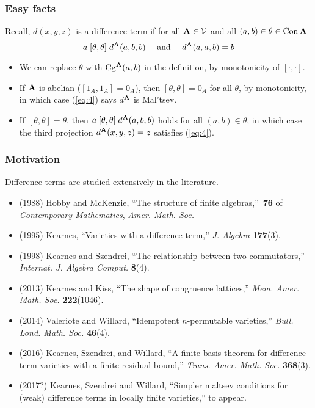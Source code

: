 \documentclass[12pt,xcolor=dvipsnames%
   ]{beamer}
\begin{document}
\begin{frame}
\frametitle{Easy facts}

Recall, $d(x,y,z)$ is a \alert{difference term}
if for all $\mathbf{A} \in \mathcal{V}$ and all $(a,b) \in \theta\in \operatorname{Con}\mathbf{A}$
\begin{equation}
\label{eq:4}  
a \mathrel{[\theta, \theta]} d^{\mathbf{A}}(a,b,b) 
\quad \text{ and } \quad
d^{\mathbf{A}}(a,a,b) = b 
\end{equation}

\begin{itemize}
\item<1->  We can replace $\theta$ 
with $\operatorname{Cg}^{\mathbf{A}}(a,b)$ in the definition, 
by monotonicity of $[\cdot, \cdot]$.
\item<2->
  If $\mathbf{A}$ is \alert{abelian} ($[1_A, 1_A] = 0_A$), then 
  $[\theta, \theta] = 0_A$ for all $\theta$, by
  monotonicity, in which case
  (\ref{eq:4}) says $d^{\mathbf{A}}$ is Mal'tsev.
\item<3-> If $[\theta, \theta] = \theta$, then
  $a \mathrel{[\theta, \theta]} d^{\mathbf{A}}(a,b,b)$ holds
  for all $(a, b) \in \theta$, in which case
the third projection $d^{\mathbf{A}}(x,y,z) = z$ satisfies (\ref{eq:4}).
\end{itemize}


\end{frame}


\begin{frame}
  \frametitle{Motivation}
Difference terms are studied extensively in the literature.

\begin{itemize}
\item
  {\footnotesize (1988)
    Hobby and McKenzie, ``The structure of finite algebras,''~{\bf 76} of
    {\em Contemporary Mathematics}, {\em Amer. Math. Soc.} }
\item
  {\footnotesize (1995) 
    Kearnes, ``Varieties with a difference term,'' 
    {\em J. Algebra} {\bf 177}(3).}
\item
  {\footnotesize (1998)
    Kearnes and Szendrei, ``The relationship between two commutators,''
    {\em Internat. J. Algebra Comput.} {\bf 8}(4). } 
\item
  {\footnotesize (2013)
    Kearnes and Kiss, ``The shape of congruence lattices,'' 
    {\em Mem. Amer. Math. Soc.} {\bf 222}(1046).}
\item
  {\footnotesize (2014)
    Valeriote and Willard, ``Idempotent {$n$}-permutable varieties,'' 
    {\em Bull. Lond. Math. Soc.} {\bf 46}(4).}
\item
  {\footnotesize (2016)
    Kearnes, Szendrei, and Willard, ``A finite basis theorem for
    difference-term varieties with a finite residual bound,'' 
    {\em Trans. Amer. Math. Soc.} {\bf 368}(3).}
\item
  {\footnotesize (2017?)
  Kearnes, Szendrei and Willard, ``Simpler maltsev conditions for (weak)
  difference terms in locally finite varieties,'' to appear.}
\end{itemize}
\end{frame}
\end{document}
